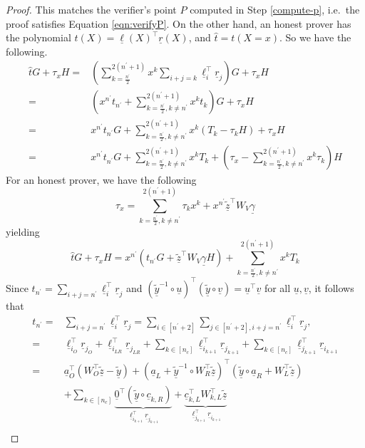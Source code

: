 \documentclass{article}
\theoremstyle{definition}
\newcommand{\zq}{\widetilde{\underline{z}}}
\newcommand{\yq}{\widetilde{\underline{y}}}
\begin{document}
\begin{proof}
This matches the verifier's point $P$ computed in Step \ref{compute-p}, i.e.\ the proof satisfies Equation \ref{eqn:verifyP}. On the other hand, an honest prover has the polynomial $t(X) = \underline{\ell}(X)^\top\underline{r}(X)$, and $\widehat{t} = t(X=x)$. So we have the following.
\begin{align*}
\widehat{t}G + \tau_x H =& \left(\sum_{k=\frac{n^\prime}{2}}^{2(n^\prime+1)} x^k \sum_{i+j=k} \underline{\ell}_i^\top\underline{r}_j\right)G + \tau_x H \\
=& \left(x^{n^\prime} t_{n^\prime} + \sum_{k=\frac{n^\prime}{2}, k \neq n^\prime}^{2(n^\prime+1)} x^k t_k\right)G + \tau_x H\\
=& x^{n^\prime} t_{n^\prime} G + \sum_{k=\frac{n^\prime}{2}, k \neq n^\prime}^{2(n^\prime+1)} x^k (T_k - \tau_k H) + \tau_x H\\
=& x^{n^\prime} t_{n^\prime} G + \sum_{k=\frac{n^\prime}{2}, k \neq n^\prime}^{2(n^\prime+1)} x^k T_k + \left(\tau_x - \sum_{k=\frac{n^\prime}{2}, k \neq n^\prime}^{2(n^\prime+1)} x^k \tau_k\right)H
\end{align*}
For an honest prover, we have the following
$$\tau_x = \sum_{k=\frac{n^\prime}{2}, k \neq n^\prime}^{2(n^\prime+1)} \tau_k x^k + x^{n^\prime} \zq^\top W_V \underline{\gamma}$$
yielding
$$\widehat{t}G + \tau_x H = x^{n^\prime} (t_{n^\prime} G + \zq^\top W_V \underline{\gamma} H) + \sum_{k=\frac{n^\prime}{2}, k \neq n^\prime}^{2(n^\prime+1)} x^k T_k$$
Since $t_{n^\prime} = \sum_{i+j=n^\prime} \underline{\ell}_i^\top \underline{r}_j$ and $(\yq^{-1} \circ \underline{u})^\top (\yq \circ \underline{v}) = \underline{u}^\top \underline{v}$ for all $\underline{u}, \underline{v}$, it follows that
\begin{align*}
t_{n^\prime} =& \sum_{i + j = n^\prime} \underline{\ell}_i^\top \underline{r}_j = \sum_{i \in [n^\prime+2]}\sum_{j \in [n^\prime+2], i+j=n^\prime} \underline{\ell}_i^\top \underline{r}_j,\\
=& \underline{\ell}_{i_O}^\top \underline{r}_{j_O} + \underline{\ell}_{i_{LR}}^\top \underline{r}_{j_{LR}} + \sum_{k \in [n_c]} \underline{\ell}_{i_{k+1}}^\top \underline{r}_{j_{k+1}} + \sum_{k \in [n_c]} \underline{\ell}_{j_{k+1}}^\top \underline{r}_{i_{k+1}} \\
=& \underline{a}_O^\top (W^\top_O \zq - \yq) + (\underline{a}_L + \yq^{-1} \circ W_R^\top \zq)^\top(\yq \circ \underline{a}_R + W_L^\top \zq) \\& + \sum_{k \in [n_c]} \underbrace{\underline{0}^\top \left( \yq \circ \underline{c}_{k,R}\right)}_{\underline{\ell}_{i_{k+1}}^\top \underline{r}_{j_{k+1}}} + \underbrace{\underline{c}_{k,L}^\top W_{k,L}^\top \zq}_{\underline{\ell}_{j_{k+1}}^\top \underline{r}_{i_{k+1}}}\\

\end{align*}
\end{proof}
\end{document}

